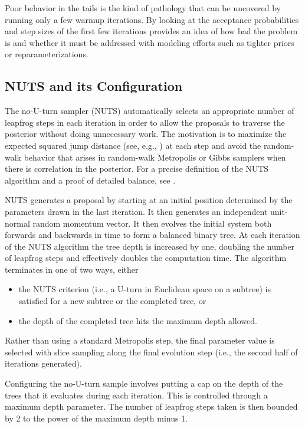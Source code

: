 Poor behavior in the tails is the kind of pathology that can be
uncovered by running only a few warmup iterations. By looking at the
acceptance probabilities and step sizes of the first few iterations
provides an idea of how bad the problem is and whether it must be
addressed with modeling efforts such as tighter priors or
reparameterizations.


\subsection{NUTS and its Configuration}

The no-U-turn sampler (NUTS) automatically selects an appropriate
number of leapfrog steps in each iteration in order to allow the
proposals to traverse the posterior without doing unnecessary work.
The motivation is to maximize the expected squared jump distance (see,
e.g., \citep{RobertsEtAl:1997}) at each step and avoid the random-walk behavior
that arises in random-walk Metropolis or Gibbs samplers when there is
correlation in the posterior. For a precise definition of the NUTS
algorithm and a proof of detailed balance, see
\citep{Hoffman-Gelman:2011,
  Hoffman-Gelman:2014}.

NUTS generates a proposal by starting at an initial position
determined by the parameters drawn in the last iteration. It then
generates an independent unit-normal random momentum vector. It then
evolves the initial system both forwards and backwards in time to form
a balanced binary tree. At each iteration of the NUTS algorithm the
tree depth is increased by one, doubling the number of leapfrog steps
and effectively doubles the computation time. The algorithm terminates
in one of two ways, either
%
\begin{itemize}
\item the NUTS criterion (i.e., a U-turn in Euclidean space on a
  subtree) is satisfied for a new subtree or the completed tree, or
\item the depth of the completed tree hits the maximum depth allowed.
\end{itemize}
%
Rather than using a standard Metropolis step, the final parameter
value is selected with slice sampling along the final evolution step
(i.e., the second half of iterations generated).

Configuring the no-U-turn sample involves putting a cap on the depth
of the trees that it evaluates during each iteration.   This is
controlled through a maximum depth parameter.   The number of leapfrog
steps taken is then bounded by 2 to the power of the maximum depth minus 1.

